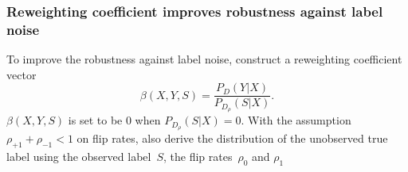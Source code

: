 \documentclass[12pt]{article} %
\newcommand{\rhoo}{\rho_{+1}}
\newcommand{\rhoz}{\rho_{-1}}
\begin{document}
\subsubsection{Reweighting coefficient improves robustness against label noise}
To improve the robustness against label noise, \citet{liu2016classification} construct a reweighting coefficient vector~
\begin{equation}
\beta(X,Y,S)=\frac{P_D(Y|X)}{P_{D_\rho}(S|X)}. \label{beta}
\end{equation}
$\beta(X,Y,S)$ is set to be $0$ when $P_{D_\rho}(S|X)=0$.
With the assumption $\rhoo+\rhoz<1$ on flip rates, \citet{liu2016classification} also derive the distribution of the unobserved  true label using the observed label~$S$, the flip rates~$\rho_{0}$ and $\rho_{1}$
\end{document}
